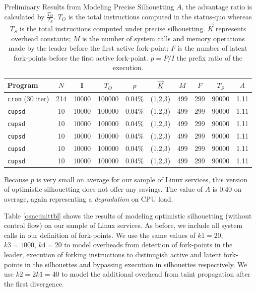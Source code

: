 \begin{table}[h]
  \caption{\hspace{0.2in}Preliminary Results from Modeling Precise Silhouetting \newline \newline 
  $A$, the advantage ratio is calculated by $\frac{T_O}{T_S}$.
  $T_O$ is the total instructions computed in the status-quo whereas $T_S$ is the total instructions computed under
  precise silhouetting. $\vec K$ represents overhead constants; $M$ is the number
  of system calls and memory operations made by the leader before the first active fork-point; $F$
  is the number of latent fork-points before the first active fork-point. $p = P/I$
  the prefix ratio of the execution. }
\label{ps:inittbl}
\begin{center}
\begin{tabular}{|l||c|c||c||c|c|c|c||c||c|}\hline
  Program & $N$ & I & $T_O$ & $p$ & $\vec K$ & $M$ & $F$ & $T_S$ & $A$ \\\hline
  \texttt{cron} (30 iter) & 214 & 10000 & 100000 & 0.04\% & (1,2,3) & 499 & 299 & 90000 & 1.11  \\\hline
  \texttt{cupsd} & 10 & 10000 & 100000 & 0.04\% & (1,2,3) & 499 & 299 & 90000 & 1.11  \\\hline
  \texttt{cupsd} & 10 & 10000 & 100000 & 0.04\% & (1,2,3) & 499 & 299 & 90000 & 1.11  \\\hline
  \texttt{cupsd} & 10 & 10000 & 100000 & 0.04\% & (1,2,3) & 499 & 299 & 90000 & 1.11  \\\hline
  \texttt{cupsd} & 10 & 10000 & 100000 & 0.04\% & (1,2,3) & 499 & 299 & 90000 & 1.11  \\\hline

  \texttt{cupsd} & 10 & 10000 & 100000 & 0.04\% & (1,2,3) & 499 & 299 & 90000 & 1.11  \\\hline
\end{tabular}
\end{center}
\end{table}

Because $p$ is very small on average for our sample of Linux services, 
this version of optimistic silhouetting does not offer any savings.
The value of $A$ is 0.40
on average, again representing a {\em degradation}
on CPU load.
 
 \newline
Table \ref{osnc:inittbl} shows the results of modeling 
optimistic silhouetting (without control flow) on our sample of Linux services.
As before, we include all system calls in our definition
of fork-points.
We use the same values of $k1 = 20$, $k3 = 1000$, $k4 = 20$
to model overheads from detection of fork-points in the leader,
execution of forking instructions to distinugish
active and latent fork-points in the silhouettes and
bypassing execution in silhouettes respectively.
We use $k2 = 2k1 = 40$ to model the additional
overhead from taint propagation after the first
divergence.

